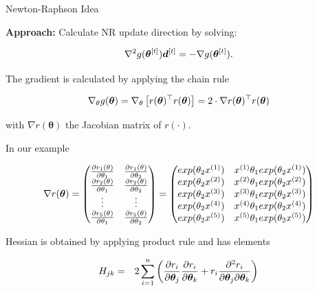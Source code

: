 \documentclass[11pt,compress,t,notes=noshow, xcolor=table]{beamer}
\begin{document}
\begin{vbframe}{Newton-Raphson Idea}


\textbf{Approach:} Calculate NR update direction by solving:

$$
\nabla^2 g(\bm{\theta}^{[t]}) \bm{d}^{[t]} = - \nabla g(\bm{\theta}^{[t]}).
$$

The gradient is calculated by applying the chain rule

$$
	\nabla_\theta g(\bm{\theta}) = \nabla_\theta \left[r(\bm{\theta})^\top r(\bm{\theta})\right] = 2 \cdot  \nabla r(\bm{\theta})^\top r(\bm{\theta})
$$

with $\nabla r(\bm{\theta})$ the Jacobian matrix of $r(\cdot)$.

\lz

In our example

\begin{footnotesize}
$$
\nabla r(\bm{\theta}) = \begin{pmatrix} \frac{\partial r_1(\theta)}{\partial \theta_1} & \frac{\partial r_1(\theta)}{\partial \theta_2}\\
\frac{\partial r_2(\theta)}{\partial \theta_1} & \frac{\partial r_2(\theta)}{\partial \theta_2}\\
\vdots & \vdots \\
\frac{\partial r_5(\theta)}{\partial \theta_1} & \frac{\partial r_5(\theta)}{\partial \theta_2} \end{pmatrix} 
= \begin{pmatrix} exp(\theta_2 x^{(1)}) & x^{(1)} \theta_ 1 exp(\theta_2 x^{(1)}) \\ exp(\theta_2 x^{(2)}) & x^{(2)} \theta_ 1 exp(\theta_2 x^{(2)})\\ exp(\theta_2 x^{(3)}) & x^{(3)} \theta_1 exp(\theta_2 x^{(3)}) \\ exp(\theta_2 x^{(4)}) & x^{(4)} \theta_1 exp(\theta_2 x^{(4)}) \\ exp(\theta_2 x^{(5)}) & x^{(5)} \theta_1 exp(\theta_2 x^{(5)}) \end{pmatrix} 
$$
\end{footnotesize}

\framebreak 

Hessian is obtained by applying product rule and has elements

\begin{eqnarray*}
	H_{jk} &=& 2 \sum\limits_{i=1}^n \left(\frac{\partial r_i}{\partial \bm{\theta}_j}\frac{\partial r_i}{\partial \bm{\theta}_k} + r_i \frac{\partial^2 r_i}{\partial \bm{\theta}_j \partial \bm{\theta}_k}\right)
\end{eqnarray*}


\end{vbframe}
\end{document}
